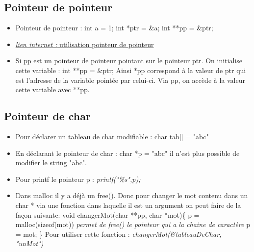 \documentclass[12pt,a4paper]{article}
\begin{document}
\subsection{Pointeur de pointeur}
\begin{itemize}
\item Pointeur de pointeur : int a = 1; int *ptr = \&a; int **pp = \&ptr;
\item \href{https://stackoverflow.com/questions/5580761/why-use-double-pointer-or-why-use-pointers-to-pointers}{\textit{lien internet : }utilisation pointeur de pointeur}
\item Si pp est un pointeur de pointeur pointant sur le pointeur ptr. On initialise cette variable : int **pp = \&ptr; Ainsi *pp correspond à la valeur de ptr qui est l'adresse de la variable pointée par celui-ci. Via pp, on accède à la valeur cette variable avec **pp.
\end{itemize}

\subsection{Pointeur de char}
\begin{itemize}
\item Pour déclarer un tableau de char modifiable : char tab[] = "abc"
\item En déclarant le pointeur de char : char *p = "abc" il n'est plus possible de modifier le string "abc".
\item Pour printf le pointeur p : \textit{printf("\%s",p);}
\item Dans malloc il y a déjà un free(). Donc pour changer le mot contenu dans un char * via une fonction dans laquelle il est un argument on peut faire de la façon suivante:
\newline void changerMot(char **pp, char *mot)\{
\newline *p = malloc(sizeof(mot)) \textit{permet de free() le pointeur qui a la chaine de caractère}
\newline *p = mot; \}
\newline Pour utiliser cette fonction : \textit{changerMot(\&tableauDeChar, "unMot")}
\end{itemize}
\end{document}
